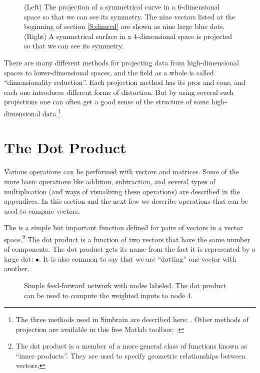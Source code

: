 \begin{figure}[h]
\centering
{}
\caption[Scott Hotton.]{(Left) The projection of a symmetrical curve in a 6-dimensional space 
so that we can see its symmetry. The nine vectors listed at the beginning of 
section \ref{S:dimred} are shown as nine large blue dots. (Right) A 
symmetrical surface in a 4-dimensional space is projected so that we can see 
its symmetry.}
\label{F:projection}
\end{figure}

There are many different methods for projecting data from high-dimensional spaces to lower-dimensional spaces, and the field as a whole is called ``dimensionality reduction''. Each projection method has its pros and cons, and each one introduces different forms of distortion. But by using several such projections one can often get a good sense of the structure of some high-dimensional data.\footnote{The three methods used in Simbrain are described here: . Other methods of projection are available in this free Matlab toolbox: .}

\section{The Dot Product}\label{dotProduct}

Various operations can be performed with vectors and matrices. Some of the more basic operations like addition, subtraction, and several types of multiplication (and ways of visualizing these operations) are described in the appendices. In this section and the next few we describe operations that can be used to compare vectors.

   The  is a simple but important function defined for 
pairs of vectors in a vector space.\footnote{The dot product is a member 
of a more general class of functions known as ``inner products''. They are 
used to specify geometric relationships between vectors.}  The dot product is a function of two 
vectors that have the same 
number of components. The dot product gets its name from the fact it is represented by 
a large dot: $\bullet$. It is also common to say that we are ``dotting'' one 
vector with another.
\begin{figure}[h]
\centering
{}
\caption[Simbrain screenshot.]{Simple feed-forward network with nodes labeled. 
The dot product can be used to compute the weighted inputs to node 4.} 
\label{F:simplelabelled}
\end{figure}


